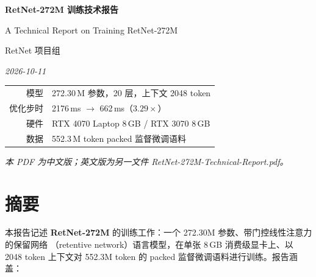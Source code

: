 \documentclass[11pt,openany]{ctexart}
\begin{document}
\thispagestyle{empty}

\begin{center}
\vspace*{3.2cm}

{\LARGE\bfseries RetNet-272M 训练技术报告}

\vspace{0.55cm}

{\large A Technical Report on Training RetNet-272M}

\vspace{1.1cm}

{\normalsize RetNet 项目组}

\vspace{0.25cm}

{\small\itshape 2026-10-11}

\vspace{2.2cm}

\begin{minipage}{0.80\textwidth}
\centering\small
\begin{tabular}{@{}rl@{}}
\toprule
模型 & 272.30\,M 参数，20 层，上下文 2048 token \\
优化步时 & 2176\,ms $\rightarrow$ 662\,ms（$3.29\times$） \\
硬件 & RTX 4070 Laptop 8\,GB / RTX 3070 8\,GB \\
数据 & 552.3\,M token packed 监督微调语料 \\
\bottomrule
\end{tabular}
\end{minipage}

\vfill

{\small\itshape 本 PDF 为中文版；英文版为另一文件 RetNet-272M-Technical-Report.pdf。}

\vspace{1.2cm}
\end{center}

\clearpage

\section*{摘要}

本报告记述 \textbf{RetNet-272M} 的训练工作：一个 272.30M 参数、带门控线性注意力的保留网络
（retentive network）语言模型，在单张 8\,GB 消费级显卡上、以 2048 token 上下文对
552.3M token 的 packed 监督微调语料进行训练。报告涵盖：
\end{document}
